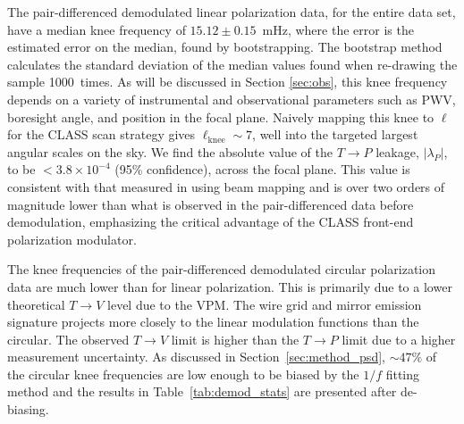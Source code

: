\documentclass[twocolumn, tighten, numberedappendix, twocolappendix]{aastex63}
\begin{document}
The pair-differenced demodulated linear polarization data, for the entire data set, have a median knee frequency of $15.12\pm0.15$~mHz, where the error is the estimated error on the median, found by bootstrapping. The bootstrap method calculates the standard deviation of the median values found when re-drawing the sample 1000~times. As will be discussed in Section \ref{sec:obs}, this knee frequency depends on a variety of instrumental and observational parameters such as PWV, boresight angle, and position in the focal plane. Naively mapping this knee to $\ell$ for the CLASS scan strategy gives $\ell_\mathrm{knee} \sim 7$, well into the targeted largest angular scales on the sky. We find the absolute value of the $T\rightarrow P$ leakage, $|\lambda_P|$, to be $<3.8\times 10^{-4}$ (95\% confidence), across the focal plane. This value is consistent with that measured in \cite{xu20} using beam mapping and is over two orders of magnitude lower than what is observed in the pair-differenced data before demodulation, emphasizing the critical advantage of the CLASS front-end polarization modulator.

The knee frequencies of the pair-differenced demodulated circular polarization data are much lower than for linear polarization. This is primarily due to a lower theoretical $T\rightarrow V$ level due to the VPM. The wire grid and mirror emission signature projects more closely to the linear modulation functions than the circular. The observed $T\rightarrow V$ limit is higher than the $T\rightarrow P$ limit due to a higher measurement uncertainty. As discussed in Section~\ref{sec:method_psd}, $\sim47\%$ of the circular knee frequencies are low enough to be biased by the $1/f$ fitting method and the results in Table~\ref{tab:demod_stats} are presented after de-biasing. 

\end{document}
